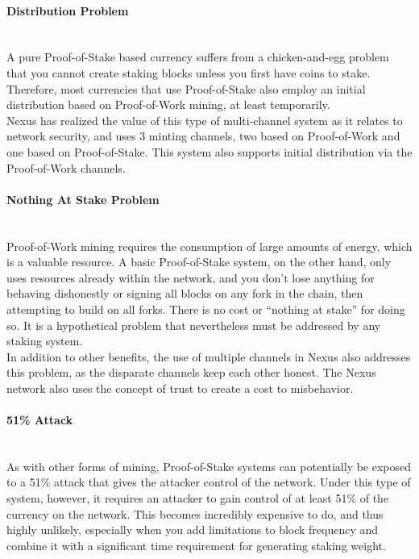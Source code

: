 \documentclass[11pt]{article}
\begin{document}
\paragraph{Distribution Problem} ~\\
A pure Proof-of-Stake based currency suffers from a chicken-and-egg problem that you cannot create staking blocks unless you first have coins to stake. Therefore, most currencies that use Proof-of-Stake also employ an initial distribution based on Proof-of-Work mining, at least temporarily.\\

\noindent Nexus has realized the value of this type of multi-channel system as it relates to network security, and uses 3 minting channels, two based on Proof-of-Work and one based on Proof-of-Stake. This system also supports initial distribution via the Proof-of-Work channels.

\paragraph{Nothing At Stake Problem} ~\\
Proof-of-Work mining requires the consumption of large amounts of energy, which is a valuable resource. A basic Proof-of-Stake system, on the other hand, only uses resources already within the network, and you don’t lose anything for behaving dishonestly or signing all blocks on any fork in the chain, then attempting to build on all forks. There is no cost or “nothing at stake” for doing so. It is a hypothetical problem that nevertheless must be addressed by any staking system.\\

\noindent In addition to other benefits, the use of multiple channels in Nexus also addresses this problem, as the disparate channels keep each other honest. The Nexus network also uses the concept of trust to create a cost to misbehavior. 

\paragraph{51\% Attack} ~\\
As with other forms of mining, Proof-of-Stake systems can potentially be exposed to a 51\% attack that gives the attacker control of the network. Under this type of system, however, it requires an attacker to gain control of at least 51\% of the currency on the network. This becomes incredibly expensive to do, and thus highly unlikely, especially when you add limitations to block frequency and combine it with a significant time requirement for generating staking weight.\\
\end{document}
